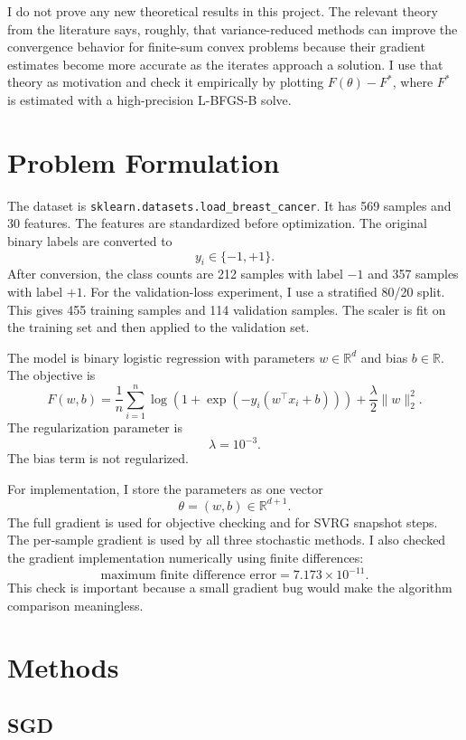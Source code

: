 \documentclass{article}
\begin{document}
I do not prove any new theoretical results in this project. The relevant theory
from the literature says, roughly, that variance-reduced methods can improve the
convergence behavior for finite-sum convex problems because their gradient
estimates become more accurate as the iterates approach a solution. I use that
theory as motivation and check it empirically by plotting $F(\theta)-F^*$,
where $F^*$ is estimated with a high-precision L-BFGS-B solve.

\section{Problem Formulation}

The dataset is \texttt{sklearn.datasets.load\_breast\_cancer}. It has
569 samples and 30 features. The
features are standardized before optimization. The original binary labels are
converted to
\[
y_i \in \{-1,+1\}.
\]
After conversion, the class counts are 212 samples with label $-1$ and 357
samples with label $+1$.
For the validation-loss experiment, I use a stratified 80/20 split. This gives
455 training samples and 114 validation samples. The scaler is fit on the
training set and then applied to the validation set.

The model is binary logistic regression with parameters $w \in \mathbb{R}^d$
and bias $b \in \mathbb{R}$. The objective is
\[
F(w,b)
= \frac{1}{n}\sum_{i=1}^{n}
\log\left(1+\exp\left(-y_i(w^\top x_i+b)\right)\right)
+ \frac{\lambda}{2}\|w\|_2^2 .
\]
The regularization parameter is
\[
\lambda = 10^{-3}.
\]
The bias term is not regularized.

For implementation, I store the parameters as one vector
\[
\theta = (w,b) \in \mathbb{R}^{d+1}.
\]
The full gradient is used for objective checking and for SVRG snapshot steps.
The per-sample gradient is used by all three stochastic methods. I also checked
the gradient implementation numerically using finite differences:
\[
\text{maximum finite difference error} = 7.173 \times 10^{-11}.
\]
This check is important because a small gradient bug would make the algorithm
comparison meaningless.

\section{Methods}

\subsection{SGD}
\end{document}
